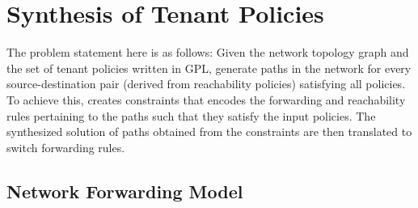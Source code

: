 \section{Synthesis of Tenant Policies} \label{sec:synthesisalgo}

The problem statement here is as follows: Given the network topology
graph and the set of tenant policies written in GPL, generate paths in
the network for every source-destination pair 
(derived from reachability policies)
satisfying all policies.  To achieve this, \Name
creates constraints that encodes the forwarding and reachability rules
pertaining to the paths such that they satisfy the input policies.
The synthesized solution of paths obtained from the constraints are
then translated to switch forwarding rules.  


\subsection{Network Forwarding Model} \label{sec:fwdmodel}


